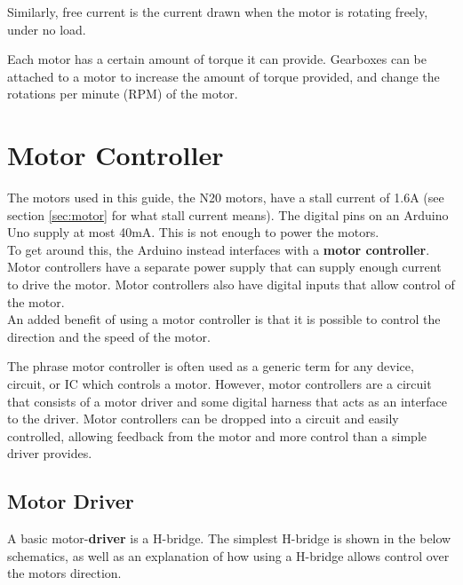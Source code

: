 \documentclass[a4paper,12pt]{article}
\begin{document}
Similarly, free current is the current drawn when the motor is rotating freely, under no load. 

\bigskip


Each motor has a certain amount of torque it can provide. Gearboxes can be attached to a motor to increase the amount of torque provided, and change the rotations per minute (RPM) of the motor. 





\pagebreak
\section{Motor Controller}

The motors used in this guide, the N20 motors, have a stall current of 1.6A (see section \ref{sec:motor} for what stall current means). The digital pins on an Arduino Uno supply at most 40mA. This is not enough to power the motors.\\ 

To get around this, the Arduino instead interfaces with a \textbf{motor controller}. Motor controllers have a separate power supply that can supply enough current to drive the motor. Motor controllers also have digital inputs that allow control of the motor. \\


An added benefit of using a motor controller is that it is possible to control the direction and the speed of the motor. 

\bigskip

The phrase motor controller is often used as a generic term for any device, circuit, or IC which controls a motor. However, motor controllers are a circuit that consists of a motor driver and some digital harness that acts as an interface to the driver. Motor controllers can be dropped into a circuit and easily controlled, allowing feedback from the motor and more control than a simple driver provides. \\




\subsection{Motor Driver}
A basic motor-\textbf{driver} is a H-bridge. The simplest H-bridge is shown in the below schematics, as well as an explanation of how using a H-bridge allows control over the motors direction. 
\end{document}
